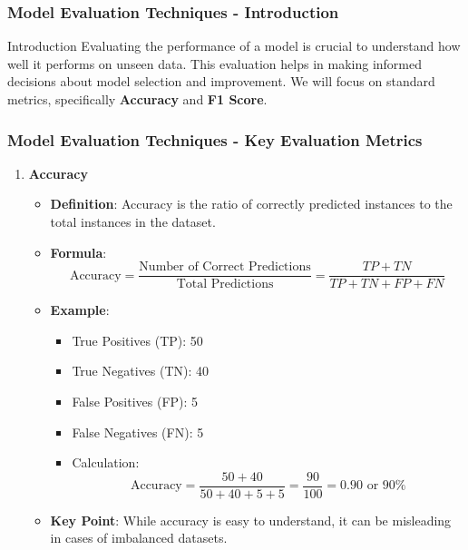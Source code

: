 \documentclass[aspectratio=169]{beamer}
\begin{document}
\begin{frame}[fragile]
    \frametitle{Model Evaluation Techniques - Introduction}
    \begin{block}{Introduction}
        Evaluating the performance of a model is crucial to understand how well it performs on unseen data. This evaluation helps in making informed decisions about model selection and improvement. We will focus on standard metrics, specifically \textbf{Accuracy} and \textbf{F1 Score}.
    \end{block}
\end{frame}

\begin{frame}[fragile]
    \frametitle{Model Evaluation Techniques - Key Evaluation Metrics}
    \begin{enumerate}
        \item \textbf{Accuracy}
        \begin{itemize}
            \item \textbf{Definition}: Accuracy is the ratio of correctly predicted instances to the total instances in the dataset.
            \item \textbf{Formula}:
            \begin{equation}
            \text{Accuracy} = \frac{\text{Number of Correct Predictions}}{\text{Total Predictions}} = \frac{TP + TN}{TP + TN + FP + FN}
            \end{equation}
            \item \textbf{Example}: 
            \begin{itemize}
                \item True Positives (TP): 50
                \item True Negatives (TN): 40
                \item False Positives (FP): 5
                \item False Negatives (FN): 5
                \item Calculation: 
                \begin{equation}
                \text{Accuracy} = \frac{50 + 40}{50 + 40 + 5 + 5} = \frac{90}{100} = 0.90 \text{ or } 90\%
                \end{equation}
            \end{itemize}
            \item \textbf{Key Point}: While accuracy is easy to understand, it can be misleading in cases of imbalanced datasets.
        \end{itemize}
    \end{enumerate}
\end{frame}
\end{document}
